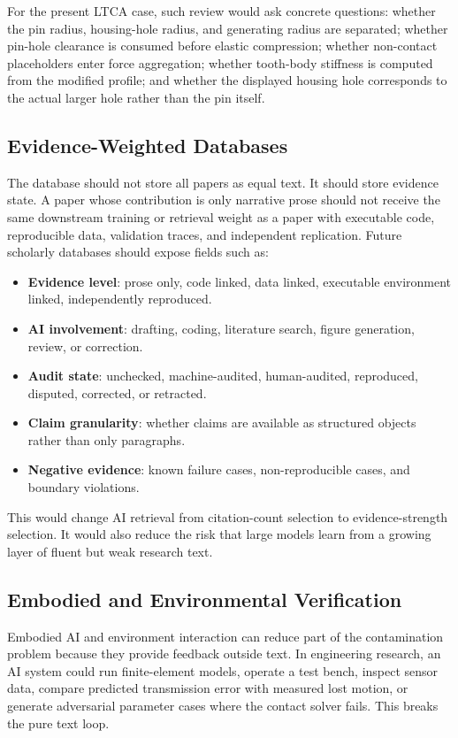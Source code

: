 \documentclass{article}
\begin{document}
For the present LTCA case, such review would ask concrete questions: whether the pin radius, housing-hole radius, and generating radius are separated; whether pin-hole clearance is consumed before elastic compression; whether non-contact placeholders enter force aggregation; whether tooth-body stiffness is computed from the modified profile; and whether the displayed housing hole corresponds to the actual larger hole rather than the pin itself.

\subsection{Evidence-Weighted Databases}

The database should not store all papers as equal text. It should store evidence state. A paper whose contribution is only narrative prose should not receive the same downstream training or retrieval weight as a paper with executable code, reproducible data, validation traces, and independent replication. Future scholarly databases should expose fields such as:

\begin{itemize}
    \item \textbf{Evidence level}: prose only, code linked, data linked, executable environment linked, independently reproduced.
    \item \textbf{AI involvement}: drafting, coding, literature search, figure generation, review, or correction.
    \item \textbf{Audit state}: unchecked, machine-audited, human-audited, reproduced, disputed, corrected, or retracted.
    \item \textbf{Claim granularity}: whether claims are available as structured objects rather than only paragraphs.
    \item \textbf{Negative evidence}: known failure cases, non-reproducible cases, and boundary violations.
\end{itemize}

This would change AI retrieval from citation-count selection to evidence-strength selection. It would also reduce the risk that large models learn from a growing layer of fluent but weak research text.

\subsection{Embodied and Environmental Verification}

Embodied AI and environment interaction can reduce part of the contamination problem because they provide feedback outside text. In engineering research, an AI system could run finite-element models, operate a test bench, inspect sensor data, compare predicted transmission error with measured lost motion, or generate adversarial parameter cases where the contact solver fails. This breaks the pure text loop.
\end{document}

